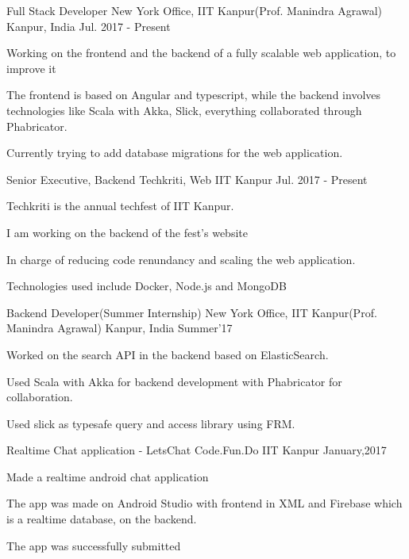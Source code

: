 \begin{cventries}
  \cventry
    {Full Stack Developer}
    {New York Office, IIT Kanpur(Prof. Manindra Agrawal)}
    {Kanpur, India}
    {Jul. 2017 - Present}
    {
      \begin{cvitems}
        \item {Working on the frontend and the backend of a fully scalable web application, to improve it}
        \item {The frontend is based on Angular and typescript, while the backend involves technologies like Scala with Akka, Slick, everything collaborated through Phabricator.}
        \item {Currently trying to add database migrations for the web application.}
      \end{cvitems}
    }
    \cventry
    {Senior Executive, Backend}
    {Techkriti, Web}
    {IIT Kanpur}
    {Jul. 2017 - Present}
    {
      \begin{cvitems}
        \item {Techkriti is the annual techfest of IIT Kanpur.}
        \item {I am working on the backend of the fest's website}
        \item {In charge of reducing code renundancy and scaling the web application.}
        \item {Technologies used include Docker, Node.js and MongoDB}
      \end{cvitems} 
    }    
 \cventry
    {Backend Developer(Summer Internship)}
    {New York Office, IIT Kanpur(Prof. Manindra Agrawal)}
    {Kanpur, India}
    {Summer'17}
    {
      \begin{cvitems}
        \item {Worked on the search API in the backend based on ElasticSearch.}
        \item {Used Scala with Akka for backend development with Phabricator for collaboration.}
        \item {Used slick as typesafe query and access library using FRM.}
      \end{cvitems}
    }
  \cventry
    {Realtime Chat application - LetsChat}
    {Code.Fun.Do}
    {IIT Kanpur}
    {January,2017}
    {
      \begin{cvitems}
        \item {Made a realtime android chat application}
        \item {The app was made on Android Studio with frontend in XML and Firebase which is a realtime database, on the backend.}
        \item {The app was successfully submitted}
      \end{cvitems}
    }
  \cventry
\end{cventries}
